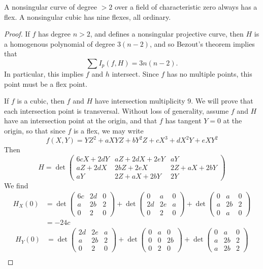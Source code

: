 \begin{corollary}
    A nonsingular curve of degree $> 2$ over a field of characteristic zero always has a flex. A nonsingular cubic has nine flexes, all ordinary.
\end{corollary}
\begin{proof}
    If $f$ has degree $n > 2$, and defines a nonsingular projective curve, then $H$ is a homogenous polynomial of degree $3(n-2)$, and so Bezout's theorem implies that
    \[ \sum I_p(f,H) = 3n(n-2). \]
    In particular, this implies $f$ and $h$ intersect. Since $f$ has no multiple points, this point must be a flex point.

    If $f$ is a cubic, then $f$ and $H$ have intersection multiplicity $9$. We will prove that each intersection point is transversal. Without loss of generality, assume $f$ and $H$ have an intersection point at the origin, and that $f$ has tangent $Y = 0$ at the origin, so that since $f$ is a flex, we may write
    \[ f(X,Y) = YZ^2 + aXYZ + bY^2Z + cX^3 + dX^2Y + eXY^2 \]
    Then
    \[ H = \det \begin{pmatrix} 6cX + 2dY & aZ + 2dX + 2eY & aY \\ aZ + 2dX & 2bZ + 2eX & 2Z + aX + 2bY \\ aY & 2Z + aX + 2bY & 2Y \end{pmatrix} \]
    We find
    \begin{align*}
        H_X(0) &= \det \begin{pmatrix} 6c & 2d & 0 \\ a & 2b & 2 \\ 0 & 2 & 0 \end{pmatrix} + \det \begin{pmatrix} 0 & a & 0 \\ 2d & 2e & a \\ 0 & 2 & 0 \end{pmatrix} + \det \begin{pmatrix} 0 & a & 0 \\ a & 2b & 2 \\ 0 & a & 0 \end{pmatrix}\\
        &= -24c
    \end{align*}
    \begin{align*}
        H_Y(0) &= \det \begin{pmatrix} 2d & 2e & a \\ a & 2b & 2 \\ 0 & 2 & 0 \end{pmatrix} + \det \begin{pmatrix} 0 & a & 0 \\ 0 & 0 & 2b \\ 0 & 2 & 0 \end{pmatrix} + \det \begin{pmatrix} 0 & a & 0 \\ a & 2b & 2 \\ a & 2b & 2 \end{pmatrix}\\

\end{align*}
\end{proof}
